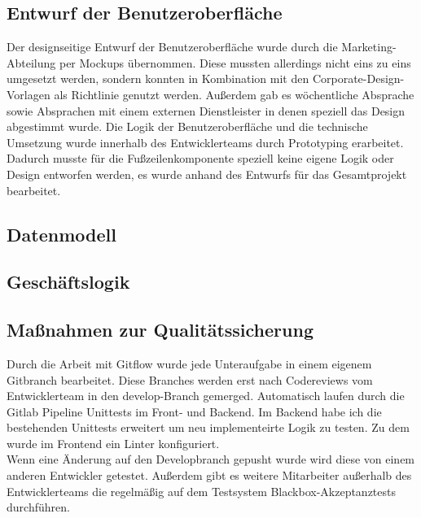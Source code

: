 \subsection{Entwurf der Benutzeroberfläche}
\label{benutzeroberfläche}
Der designseitige Entwurf der Benutzeroberfläche wurde durch die Marketing-Abteilung per Mockups übernommen. Diese mussten allerdings nicht eins zu eins umgesetzt werden, sondern konnten in Kombination mit den Corporate-Design-Vorlagen als Richtlinie genutzt werden. Außerdem gab es wöchentliche Absprache sowie Absprachen mit einem externen Dienstleister in denen speziell das Design abgestimmt wurde. Die Logik der Benutzeroberfläche und die technische Umsetzung wurde innerhalb des Entwicklerteams durch Prototyping erarbeitet.\\
Dadurch musste für die Fußzeilenkomponente speziell keine eigene Logik oder Design entworfen werden, es wurde anhand des Entwurfs für das Gesamtprojekt bearbeitet.
\subsection{Datenmodell}
\label{datenmodell}

\subsection{Geschäftslogik}
\label{geschaeftslogik}

\subsection{Maßnahmen zur Qualitätssicherung}
\label{qualitaetssicherung}
Durch die Arbeit mit Gitflow wurde jede Unteraufgabe in einem eigenem Gitbranch bearbeitet. Diese Branches werden erst nach Codereviews vom Entwicklerteam in den develop-Branch gemerged.  Automatisch laufen durch die Gitlab Pipeline Unittests im Front- und Backend. Im Backend habe ich die bestehenden Unittests erweitert um neu implementeirte Logik zu testen. Zu dem wurde im Frontend ein \gls{Linter} konfiguriert.\\
Wenn eine Änderung auf den Developbranch gepusht wurde wird diese von einem anderen Entwickler getestet. Außerdem gibt es weitere Mitarbeiter außerhalb des Entwicklerteams die regelmäßig auf dem Testsystem Blackbox-Akzeptanztests durchführen.
